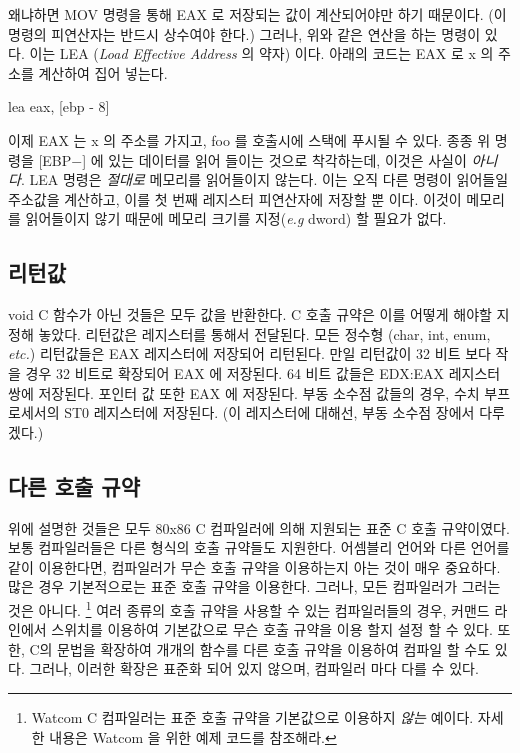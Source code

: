 왜냐하면 {\code MOV} 명령을 통해 EAX 로 저장되는 값이 계산되어야만 하기 
때문이다. (이 명령의 피연산자는 반드시 상수여야 한다.) 그러나, 위와 같은 연산을 하는
명령이 있다. 이는  {\code LEA} (\emph{Load Effective Address} 의 약자)
이다. 아래의 코드는 EAX 로 {\code x} 의 주소를 계산하여 집어 넣는다. 

\begin{AsmCodeListing}[numbers=none,frame=none]
      lea    eax, [ebp - 8]
\end{AsmCodeListing}

이제 EAX 는 {\code x} 의 주소를 가지고, {\code foo} 를 호출시에 스택에 푸시될 수 있다.
종종 위 명령을 [EBP\nolinebreak$-$] 에 있는 데이터를 읽어 들이는 것으로 착각하는데,
이것은 사실이 \emph{아니다}. {\code LEA} 명령은 \emph{절대로} 메모리를 읽어들이지 않는다.
이는 오직 다른 명령이 읽어들일 주소값을 계산하고, 이를 첫 번째 레지스터 피연산자에 저장할
뿐 이다. 이것이 메모리를 읽어들이지 않기 때문에 메모리 크기를 지정(\emph{e.g} 
{\code dword}) 할 필요가 없다. 


\subsection{리턴값}

void C 함수가 아닌 것들은 모두 값을 반환한다. C 호출 규약은 이를 어떻게 해야할 
지 정해 놓았다. 리턴값은 레지스터를 통해서 전달된다. 모든 정수형 ({\code char}, {\code int}, {\code enum}, \emph{etc.})
리턴값들은 EAX 레지스터에 저장되어 리턴된다. 만일 리턴값이 32 비트 보다 작을 경우 32 비트로 확장되어
EAX 에 저장된다. 64 비트 값들은 EDX:EAX  레지스터 쌍에 저장된다. 
포인터 값 또한 EAX 에 저장된다. 부동 소수점 값들의 경우, 수치 부프로세서의 ST0 레지스터에 저장된다.
(이 레지스터에 대해선, 부동 소수점 장에서 다루겠다.)


\subsection{다른 호출 규약}

위에 설명한 것들은 모두 80x86 C 컴파일러에 의해 지원되는 표준
C 호출 규약이였다. 보통 컴파일러들은 다른 형식의 호출 규약들도 
지원한다. 어셈블리 언어와 다른 언어를 같이 이용한다면, 컴파일러가 무슨 호출 규약을
이용하는지 아는 것이 매우 중요하다. 많은 경우 기본적으로는 표준 호출 규약을
이용한다. 그러나, 모든 컴파일러가 그러는 것은 아니다.
\footnote{Watcom C 컴파일러는  표준 호출 규약을 
기본값으로 이용하지 \emph{않는} 예이다. 자세한 내용은 Watcom 을 위한
예제 코드를 참조해라.}
여러 종류의 호출 규약을 사용할 수 있는 컴파일러들의 경우, 커맨드 라인에서 
스위치를 이용하여 기본값으로 무슨 호출 규약을 이용 할지 설정 할 수 있다. 
또한, C의 문법을 확장하여 개개의 함수를 다른 호출 규약을 이용하여 컴파일
할 수도 있다. 그러나, 이러한 확장은 표준화 되어 있지 않으며, 컴파일러 마다
다를 수 있다. 

